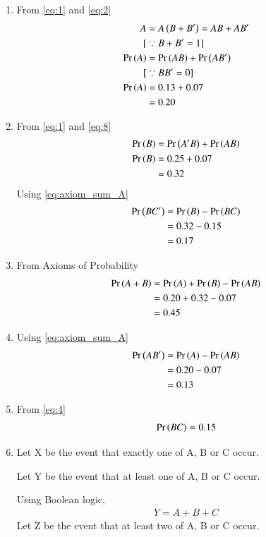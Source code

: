 \documentclass[journal,12pt,twocolumn]{IEEEtran}
\begin{document}
\begin{enumerate}[label=(\alph*)]
\item 
From \eqref{eq:1} and \eqref{eq:2}
\begin{align}
A &= A \left(B+B^{\prime}\right) =  AB + AB^{\prime}\\
[&\because B + B^\prime = 1]\\\label{eq:axiom_sum_A}
\Pr\left(A\right) &= \Pr\left(AB\right) +\Pr\left(AB^\prime\right)\\
    [&\because BB^\prime = 0] \nonumber\\
\Pr\left(A\right) &= 0.13 + 0.07\\
       &= 0.20
\end{align}
\item 
From \eqref{eq:1} and \eqref{eq:8}
\begin{align}
    \Pr\left(B\right) &= \Pr\left(A^\prime B\right) + \Pr\left(AB\right)\\
    \label{eq:3}
    \Pr\left(B\right) &= 0.25 + 0.07\\
       &= 0.32
\end{align}
Using \eqref{eq:axiom_sum_A}
\begin{align}
    \Pr\left(BC^\prime\right) &= \Pr\left(B\right) - \Pr\left(BC\right) \\
    &= 0.32 - 0.15\\
    &= 0.17
\end{align}
\item 
From Axioms of Probability
\begin{align}
\label{Axioms}
    \Pr\left(A + B\right) &= \Pr\left(A\right) + \Pr\left(B\right) - \Pr\left(AB\right)\\
    &= 0.20 + 0.32 - 0.07\\
    &= 0.45
\end{align}
\item 
Using \eqref{eq:axiom_sum_A}
\begin{align}
    \Pr\left(AB^\prime\right) &= \Pr\left(A\right) - \Pr\left(AB\right) \\
    &= 0.20 - 0.07\\
    &= 0.13
\end{align}
\item 
From \eqref{eq:4}
\begin{align}
    \Pr\left(BC\right) = 0.15
\end{align}
\item 
Let X be the event that exactly one of A, B or C occur.

Let Y be the event that at least one of A, B or C occur.

Using Boolean logic,
\begin{align}
    Y=A+B+C
\end{align}
Let Z be the event that at least two of A, B or C occur.


\end{enumerate}
\end{document}
